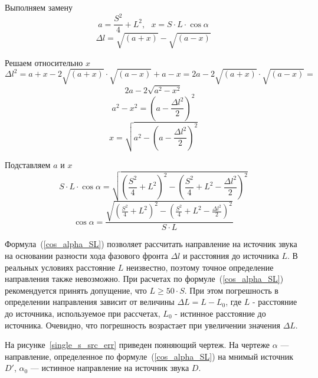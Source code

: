 \documentclass[fleqn,10pt,a4paper]{article}
\begin{document}
Выполняем замену
\begin{equation*}
	a = \frac{S^2}{4}+L^2,~~~x = S\cdot{}L\cdot\cos\alpha
\end{equation*}
\begin{equation*}
	\Delta{}l =	\sqrt{\left(a+x\right)}-\sqrt{\left(a-x\right)}
\end{equation*}

Решаем относительно $x$
\begin{equation*}
	{\Delta{}l}^2=a+x-2\sqrt{\left(a+x\right)}\cdot\sqrt{\left(a-x\right)}+a-x=2a-2\sqrt{\left(a+x\right)}\cdot\sqrt{\left(a-x\right)}=
\end{equation*}
\begin{equation*}
	2a-2\sqrt{a^2-x^2}
\end{equation*}
\begin{equation*}
	a^2-x^2=\left(a-\frac{{\Delta{}l}^2}{2}\right)^2
\end{equation*}
\begin{equation*}
	x = \sqrt{a^2-\left(a-\frac{{\Delta{}l}^2}{2}\right)^2}
\end{equation*}

Подставляем $a$ и $x$
\begin{equation*}
	S\cdot{}L\cdot\cos\alpha =
	\sqrt{\left(\frac{S^2}{4}+L^2\right)^2-\left(\frac{S^2}{4}+L^2-\frac{{\Delta{}l}^2}{2}\right)^2}
\end{equation*}
\begin{equation}
	\boxed{
		\cos\alpha =
		\frac{\sqrt{\left(\frac{S^2}{4}+L^2\right)^2-\left(\frac{S^2}{4}+L^2-\frac{{\Delta{}l}^2}{2}\right)^2}}{S\cdot{}L}
	}
	\label{cos_alpha_SL}
\end{equation}

Формула~(\ref{cos_alpha_SL}) позволяет рассчитать направление на источник звука
на основании разности хода фазового фронта $\Delta{}l$ и расстояния до источника
$L$. В реальных условиях расстояние $L$ неизвестно, поэтому точное определение
направления также невозможно. При расчетах по формуле~(\ref{cos_alpha_SL})
рекомендуется принять допущение, что $L\ge50\cdot{}S$. При этом погрешность в
определении направления зависит от величины $\Delta{}L=L-L_0$, где $L$ -
расстояние до источника, используемое при рассчетах, $L_0$ - истинное расстояние
до источника. Очевидно, что погрешность возрастает при увеличении значения
$\Delta{}L$.

На рисунке~\ref{single_s_src_err} приведен пояняющий чертеж. На чертеже
$\alpha$ --- направление, определенное по формуле~(\ref{cos_alpha_SL}) на
мнимый источник $D'$, $\alpha_0$ --- истинное направление на источник звука $D$.
\end{document}
